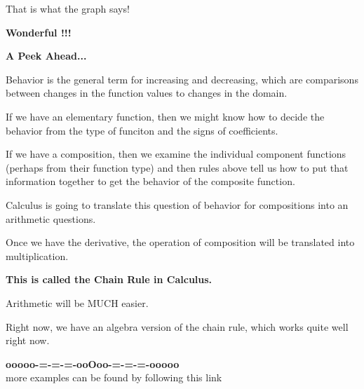 \documentclass{ximera}
\begin{document}
That is what the graph says! 


\begin{center}
\textbf{\textcolor{red!80!black}{Wonderful !!!}}
\end{center}















\textbf{\textcolor{red!70!black}{A Peek Ahead...}}


Behavior is the general term for increasing and decreasing, which are comparisons between changes in the function values to changes in the domain. 


If we have an elementary function, then we might know how to decide the behavior from the type of funciton and the signs of coefficients. 

If we have a composition, then we examine the individual component functions (perhaps from their function type) and then rules above tell us how to put that information together to get the behavior of the composite function.


Calculus is going to translate this question of behavior for compositions into an arithmetic questions.

Once we have the derivative, the operation of composition will be translated into multiplication.

\begin{center}

\textbf{\textcolor{red!70!black}{This is called the Chain Rule in Calculus.}}

\end{center}


Arithmetic will be MUCH easier.

Right now, we have an algebra version of the chain rule, which works quite well right now.

























\begin{onlineOnly}
\begin{center}
\textbf{\textcolor{green!50!black}{ooooo-=-=-=-ooOoo-=-=-=-ooooo}} \\

more examples can be found by following this link\\ 

\end{center}
\end{onlineOnly}
\end{document}
